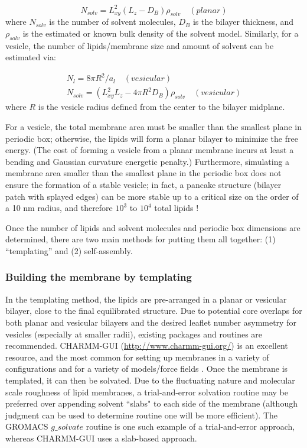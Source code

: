 \documentclass[9pt,bestpractices]{livecoms}
\begin{document}
\begin{equation}\label{eq:3}
	N_{solv} = L_{xy}^2 (L_z - D_B) \rho_{solv} \quad (planar)
\end{equation}
where $N_{solv}$ is the number of solvent molecules, $D_B$ is the bilayer thickness, and $\rho_{solv}$ is the estimated or known bulk density of the solvent model. Similarly, for a vesicle, the number of lipids/membrane size and amount of solvent can be estimated via:

\begin{subequations}\label{eq:4}
\begin{align}
N_l = 8 \pi R^2/a_l \quad (vesicular)\label{eq:4a} \\
N_{solv} = (L_{xy}^2 L_z - 4\pi R^2 D_B) \rho_{solv} \quad (vesicular)\label{eq:4b}
\end{align}
\end{subequations}
where $R$ is the vesicle radius defined from the center to the bilayer midplane.

For a vesicle, the total membrane area must be smaller than the smallest plane in periodic box; otherwise, the lipids will form a planar bilayer to minimize the free energy.
(The cost of forming a vesicle from a planar membrane incurs at least a bending and Gaussian curvature energetic penalty.)
Furthermore, simulating a membrane area smaller than the smallest plane in the periodic box does not ensure the formation of a stable vesicle; in fact, a pancake structure (bilayer patch with splayed edges) can be more stable up to a critical size on the order of a 10 nm radius, and therefore $10^3$ to $10^4$ total lipids \cite{Deserno2009}!

Once the number of lipids and solvent molecules and periodic box dimensions are determined, there are two main methods for putting them all together: (1) ``templating'' and (2) self-assembly.

\subsubsection{Building the membrane by templating}
\label{subsubsec:templating}
In the templating method, the lipids are pre-arranged in a planar or vesicular bilayer, close to the final equilibrated structure.
Due to potential core overlaps for both planar and vesicular bilayers and the desired leaflet number asymmetry for vesicles (especially at smaller radii), existing packages and routines are recommended.
CHARMM-GUI (\url{http://www.charmm-gui.org/}) is an excellent resource, and the most common for setting up membranes in a variety of configurations and for a variety of models/force fields \cite{Jo2009,Cheng2013,Wu2014,Brooks2009}.
Once the membrane is templated, it can then be solvated.
Due to the fluctuating nature and molecular scale roughness of lipid membranes, a trial-and-error solvation routine may be preferred over appending solvent ``slabs" to each side of the membrane (although judgment can be used to determine routine one will be more efficient).
The GROMACS $g\_solvate$ routine is one such example of a trial-and-error approach, whereas CHARMM-GUI uses a slab-based approach.
\end{document}
